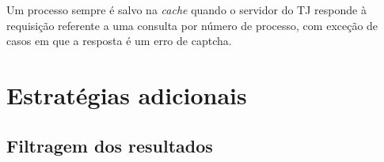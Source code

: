 Um processo sempre é salvo na \textit{cache} quando o servidor do TJ responde à
requisição referente a uma consulta por número de processo, com exceção de
casos em que a resposta é um erro de captcha.


\section{Estratégias adicionais}

\subsection{Filtragem dos resultados}
